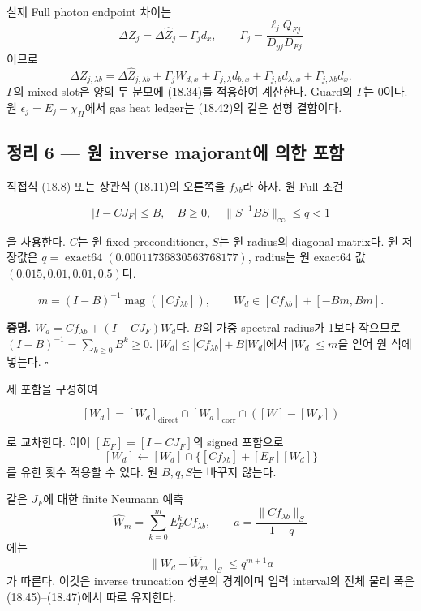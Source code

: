 실제 Full photon endpoint 차이는 \[
\Delta Z_j=\Delta\widehat Z_j+\Gamma_jd_x,\qquad
\Gamma_j=\frac{\ell_jQ_{Fj}}{D_{yj}D_{Fj}}
\] 이므로 \[
\boxed{
\Delta Z_{j,\lambda b}
=\Delta\widehat Z_{j,\lambda b}
+\Gamma_jW_{d,x}
+\Gamma_{j,\lambda}d_{b,x}
+\Gamma_{j,b}d_{\lambda,x}
+\Gamma_{j,\lambda b}d_x.
}
\tag{18.43}
\] \(\Gamma\)의 mixed slot은 양의 두 분모에 (18.34)를 적용하여 계산한다.
Guard의 \(\Gamma\)는 0이다. 원 \(\epsilon_j=E_j-\chi_H\)에서 gas heat
ledger는 (18.42)의 같은 선형 결합이다.

\hypertarget{uxc815uxb9ac-6-uxc6d0-inverse-majorantuxc5d0-uxc758uxd55c-uxd3ecuxd568}{%
\subsection{정리 6 --- 원 inverse majorant에 의한
포함}\label{uxc815uxb9ac-6-uxc6d0-inverse-majorantuxc5d0-uxc758uxd55c-uxd3ecuxd568}}

직접식 (18.8) 또는 상관식 (18.11)의 오른쪽을 \(f_{\lambda b}\)라 하자.
원 Full 조건

\[
|I-CJ_F|\le B,\quad B\ge0,\quad
\|S^{-1}BS\|_\infty\le q<1
\tag{18.44}
\]

을 사용한다. \(C\)는 원 fixed preconditioner, \(S\)는 원 radius의
diagonal matrix다. 원 저장값은
\(q=\operatorname{exact64}(0.00011736830563768177)\), radius는 원
exact64 값 \((0.015,0.01,0.01,0.5)\)다.

\[
m=(I-B)^{-1}\operatorname{mag}([Cf_{\lambda b}]),\qquad
\boxed{W_d\in[Cf_{\lambda b}]+[-Bm,Bm].}
\tag{18.45}
\]

\textbf{증명.} \(W_d=Cf_{\lambda b}+(I-CJ_F)W_d\)다. \(B\)의 가중
spectral radius가 1보다 작으므로 \((I-B)^{-1}=\sum_{k\ge0}B^k\ge0\).
\(|W_d|\le |Cf_{\lambda b}|+B|W_d|\)에서 \(|W_d|\le m\)을 얻어 원 식에
넣는다. \(\square\)

세 포함을 구성하여

\[
[W_d]=[W_d]_{\mathrm{direct}}
\cap[W_d]_{\mathrm{corr}}
\cap([W]-[W_F])
\tag{18.46}
\]

로 교차한다. 이어 \([E_F]=[I-CJ_F]\)의 signed 포함으로 \[
[W_d]\leftarrow[W_d]\cap
\{[Cf_{\lambda b}]+[E_F][W_d]\}
\tag{18.47}
\] 를 유한 횟수 적용할 수 있다. 원 \(B,q,S\)는 바꾸지 않는다.

같은 \(J_F\)에 대한 finite Neumann 예측 \[
\widehat W_m=\sum_{k=0}^mE_F^kCf_{\lambda b},\qquad
a=\frac{\|Cf_{\lambda b}\|_S}{1-q}
\] 에는 \[
\|W_d-\widehat W_m\|_S\le q^{m+1}a
\tag{18.48}
\] 가 따른다. 이것은 inverse truncation 성분의 경계이며 입력 interval의
전체 물리 폭은 (18.45)--(18.47)에서 따로 유지한다.

